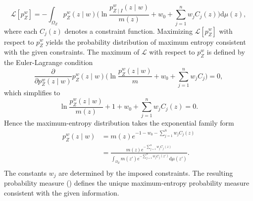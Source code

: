 \begin{equation}
	\mathcal{L}[p_{Z}^w] = - \int_{\Omega_Z} 
	p_{Z}^w(z \mid w) \Bigg(
	\ln \frac{p_{Z\mid I}^w(z \mid w)}{m(z)}
	+ w_0 + \sum_{j=1}^n w_j C_j(z)
	\Bigg) \mathrm{d}\mu(z),
\end{equation}
where each $C_j(z)$ denotes a constraint function. Maximizing $\mathcal{L}[p_{Z}^w]$ with respect to $p_{Z}^w$ yields the probability distribution of maximum entropy consistent with the given constraints. The maximum of $\mathcal{L}$ with respect to $p_{Z}^w$ is defined by the Euler-Lagrange condition
\begin{equation}
	\frac{\partial}{\partial p_{Z}^w(z \mid w)} p_{Z}^w(z \mid w)\Big(\ln \frac{p_{Z}^w(z \mid w)}{m} + w_0 + \sum_{j=1}^n w_j C_j\Big) = 0,
\end{equation}
which simplifies to
\begin{equation}
	\ln \frac{p_{Z}^w(z \mid w)}{m(z)} + 1 + w_0 + \sum_{j=1}^n w_j C_j(z) = 0.
\end{equation}
Hence the maximum-entropy distribution takes the exponential family form
\begin{equation}
	\begin{split}
		p_{Z}^w(z \mid w)
		&= m(z) e^{-1 - w_0 - \sum_{j=1}^n w_j C_j(z)} \\
		&= \frac{m(z) e^{-\sum_{j=1}^n w_j C_j(z)}}{
			\int_{\Omega_Z} m(z') e^{-\sum_{j=1}^n w_j C_j(z')} \mathrm{d}\mu(z')}.\\
	\end{split}
\end{equation}
The constants $w_j$ are determined by the imposed constraints. The resulting probability measure () defines the unique maximum-entropy probability measure consistent with the given information.

